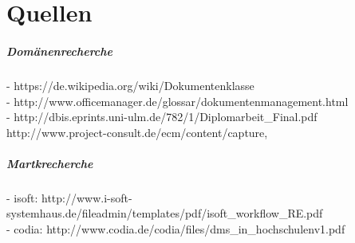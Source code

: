 \chapter{Quellen}


\paragraph*{Domänenrecherche}
- https://de.wikipedia.org/wiki/Dokumentenklasse\\
- http://www.officemanager.de/glossar/dokumentenmanagement.html\\
- http://dbis.eprints.uni-ulm.de/782/1/Diplomarbeit_Final.pdf\\
http://www.project-consult.de/ecm/content/capture, 

\paragraph*{Martkrecherche}

- isoft: http://www.i-soft-systemhaus.de/fileadmin/templates/pdf/isoft_workflow_RE.pdf \\
- codia: http://www.codia.de/codia/files/dms_in_hochschulenv1.pdf